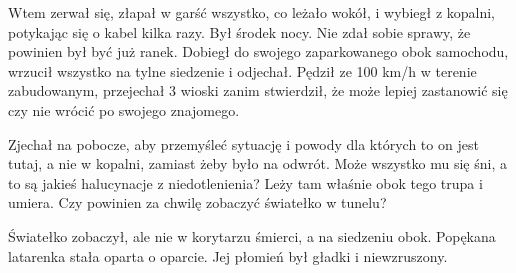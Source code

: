 Wtem zerwał się, złapał w garść wszystko, co leżało wokół, i wybiegł z kopalni, potykając się o kabel kilka razy.
Był środek nocy. 
Nie zdał sobie sprawy, że powinien był być już ranek.
Dobiegł do swojego zaparkowanego obok samochodu, wrzucił wszystko na tylne siedzenie i odjechał.
Pędził ze 100 km/h w terenie zabudowanym, przejechał 3 wioski zanim stwierdził, że może lepiej zastanowić się czy nie wrócić po swojego znajomego.

Zjechał na pobocze, aby przemyśleć sytuację i powody dla których to on jest tutaj, a nie w kopalni, zamiast żeby było na odwrót.
Może wszystko mu się śni, a to są jakieś halucynacje z niedotlenienia?
Leży tam właśnie obok tego trupa i umiera.
Czy powinien za chwilę zobaczyć światełko w tunelu?

Światełko zobaczył, ale nie w korytarzu śmierci, a na siedzeniu obok.
Popękana latarenka stała oparta o oparcie. Jej płomień był gładki i niewzruszony.
